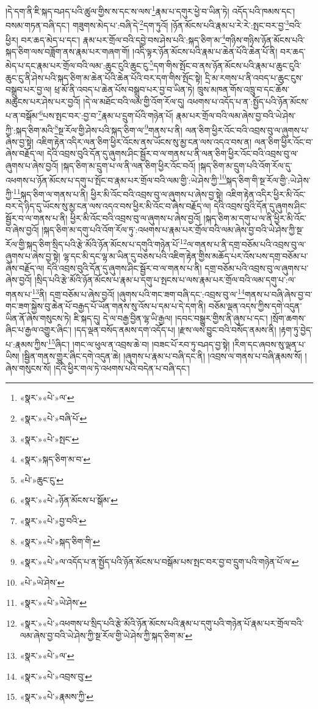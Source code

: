 །དེ་དག་ནི་ཇི་སྐད་བཤད་པའི་ཚུལ་གྱིས་ས་དང་ས་ལས་\footnote{«སྣར་»«པེ་»ལ་}རྣམ་པ་དགུར་ཕྱེ་བ་ཡིན་ཏེ། འདོད་པའི་ཁམས་དང་། བསམ་གཏན་བཞི་དང་། གཟུགས་མེད་པ་:བཞི་དེ་\footnote{«སྣར་»«པེ་»བཞི་པོ་}དག་ཏུའོ། །ཉོན་མོངས་པའི་རྣམ་པ་རེ་རེ་:སྤང་བར་བྱ་\footnote{«སྣར་»«པེ་»སྤང་}བའི་ཕྱིར། བར་ཆད་མེད་པ་དང་། རྣམ་པར་གྲོལ་བའི་དབྱེ་བས་ཤེས་པའི་:སྐད་ཅིག་མ་\footnote{«སྣར་»སྐད་ཅིག་མ་བ་}གཉིས་གཉིས་ཉོན་མོངས་པའི་སྐད་ཅིག་ལས་བཟློག་ནས་རྣམ་པར་གཞག་གོ། །འདི་ལྟར་ཉོན་མོངས་པའི་རྣམ་པ་ཆེན་པོའི་ཆེན་པོ་ནི། བར་ཆད་མེད་པ་དང་རྣམ་པར་གྲོལ་བའི་ལམ་:ཆུང་ངུའི་ཆུང་ངུ་\footnote{«པེ་»ཆུང་ངུ་}དག་གིས་སྤོང་བ་ནས་ཉོན་མོངས་པའི་རྣམ་པ་ཆུང་ངུའི་ཆུང་ངུ་ནི་ཤེས་པའི་སྐད་ཅིག་མ་ཆེན་པོའི་ཆེན་པོའི་བར་དག་གིས་སྤོང་སྟེ། དྲི་མ་རགས་པ་ནི་འབད་པ་ཆུང་ངུས་བསྒྲུབ་པར་བྱ་ལ། ཕྲ་མོ་ནི་འབད་པ་ཆེན་པོས་བསྒྲུབ་པར་བྱ་བ་ཡིན་ཏེ། ཁྲུས་མཁན་གོས་འཁྲུ་བ་དང་ཆོས་མཚུངས་པར་ཤེས་པར་བྱའོ། །དེ་ལ་མཐོང་བའི་ལམ་གྱི་འོག་རོལ་དུ། འཕགས་པ་འདོད་པ་ན་:སྤྱོད་པའི་ཉོན་མོངས་པ་ན་བསྒོམ་\footnote{«སྣར་»«པེ་»ཉོན་མོངས་པ་སྒོམ་}པས་སྤང་བར་:བྱ་བ་\footnote{«སྣར་»«པེ་»བྱ་བའི་}རྣམ་པ་དྲུག་པོའི་གཉེན་པོ། རྣམ་པར་གྲོལ་བའི་ལམ་ཞེས་བྱ་བའི་ཡེ་ཤེས་ཀྱི་:སྐད་ཅིག་མའི་\footnote{«སྣར་»«པེ་»སྐད་ཅིག་གི་}སྔ་རོལ་གྱི་ཤེས་པའི་སྐད་ཅིག་ལ་\footnote{«སྣར་»«པེ་»ལ་འདོད་པ་ན་སྤྱོད་པའི་ཉོན་མོངས་པ་བསྒོམ་པས་སྤང་བར་བྱ་བ་དྲུག་པའི་གཉེན་པོ་ལ་}གནས་པ་ནི། ལན་ཅིག་ཕྱིར་འོང་བའི་འབྲས་བུ་ལ་ཞུགས་པ་ཞེས་བྱ་སྟེ། འཇིག་རྟེན་འདིར་ལན་ཅིག་ཕྱིར་འོངས་ནས་ཡོངས་སུ་མྱ་ངན་ལས་འདའ་བས་ན། ལན་ཅིག་ཕྱིར་འོང་བ་ཞེས་བརྗོད་ལ། དེའི་འབྲས་བུའི་དོན་དུ་ཞུགས་ཤིང་སྦྱོར་བ་ལ་གནས་པ་ནི་ལན་ཅིག་ཕྱིར་འོང་བའི་འབྲས་བུ་ལ་ཞུགས་པ་ཞེས་བྱའོ། །སྐད་ཅིག་མ་དྲུག་པ་ལ་ནི་ལན་ཅིག་ཕྱིར་འོང་བའོ། །སྐད་ཅིག་མ་དྲུག་པའི་འོག་རོལ་དུ་འཕགས་པ་ཉོན་མོངས་པ་དགུ་པ་སྤོང་བ་རྣམ་པར་གྲོལ་བའི་ལམ་གྱི་:ཡེ་ཤེས་ཀྱི་\footnote{«པེ་»ཡེ་ཤེས་}སྐད་ཅིག་གི་སྔ་རོལ་གྱི་:ཡེ་ཤེས་ཀྱི་\footnote{«སྣར་»«པེ་»ཡེ་ཤེས་}སྐད་ཅིག་ལ་གནས་པ་ནི། ཕྱིར་མི་འོང་བའི་འབྲས་བུ་ལ་ཞུགས་པ་ཞེས་བྱ་སྟེ། འཇིག་རྟེན་འདིར་ཕྱིར་མི་འོང་བར་དེ་ཉིད་དུ་ཡོངས་སུ་མྱ་ངན་ལས་འདའ་བས་ཕྱིར་མི་འོང་བ་ཞེས་བརྗོད་ལ། དེའི་འབྲས་བུའི་དོན་དུ་ཞུགས་ཤིང་སྦྱོར་བ་ལ་གནས་པ་ནི། ཕྱིར་མི་འོང་བའི་འབྲས་བུ་ལ་ཞུགས་པ་ཞེས་བྱའོ། །སྐད་ཅིག་མ་དགུ་པ་ལ་ནི་ཕྱིར་མི་འོང་བ་ཞེས་བྱའོ། །སྐད་ཅིག་མ་དགུ་པའི་འོག་རོལ་ཏུ་:འཕགས་པ་རྣམ་པར་གྲོལ་བའི་ལམ་ཞེས་བྱ་བའི་ཡེ་ཤེས་ཀྱི་སྔ་རོལ་གྱི་སྐད་ཅིག་སྲིད་པའི་རྩེ་མོའི་ཉོན་མོངས་པ་དགུའི་གཉེན་པོ་\footnote{«སྣར་»«པེ་»འཕགས་པ་སྲིད་པའི་རྩེ་མོའི་ཉོན་མོངས་པའི་རྣམ་པ་དགུ་པའི་གཉེན་པོ་རྣམ་པར་གྲོལ་བའི་ལམ་ཞེས་བྱ་བའི་ཡེ་ཤེས་ཀྱི་སྔ་རོལ་གྱི་ཡེ་ཤེས་ཀྱི་སྐད་ཅིག་མ་}ལ་གནས་པ་ནི་དགྲ་བཅོམ་པའི་འབྲས་བུ་ལ་ཞུགས་པ་ཞེས་བྱ་སྟེ། ལྷ་དང་མི་དང་ལྷ་མ་ཡིན་དུ་བཅས་པའི་འཇིག་རྟེན་གྱིས་མཆོད་པར་འོས་པས་དགྲ་བཅོམ་པ་ཞེས་བརྗོད་ལ། དེའི་འབྲས་བུའི་དོན་དུ་ཞུགས་ཤིང་སྦྱོར་བ་ལ་གནས་པ་ནི། དགྲ་བཅོམ་པའི་འབྲས་བུ་ལ་ཞུགས་པ་ཞེས་བྱའོ། །སྲིད་པའི་རྩེ་མོའི་ཉོན་མོངས་པ་རྣམ་པ་དགུ་པ་སྤངས་པ་ལས་རྣམ་པར་གྲོལ་བའི་ལམ་དགུ་པ་:ལ་གནས་པ་\footnote{«སྣར་»«པེ་»ལ་}ནི། དགྲ་བཅོམ་པ་ཞེས་བྱའོ། །ཞུགས་པའི་གང་ཟག་བཞི་དང་:འབྲས་བུ་ལ་\footnote{«སྣར་»«པེ་»འབྲས་བུ་}གནས་པ་བཞི་ཞེས་བྱ་བ་གང་ཟག་སྐྱེས་བུ་ཆེན་པོ་བརྒྱད་པོ་ཡོན་གནས་སུ་འོས་པ་དམ་པ་དེ་དག་ནི། བཅོམ་ལྡན་འདས་ཀྱིས་དགེ་འདུན་ཡིན་ནོ་ཞེས་གསུངས་ཏེ། ཇི་སྐད་དུ། དེ་ལ་བརྒྱ་བྱིན་ལྷ་ཡི་རྒྱལ། །དབང་བསྒྱུར་གྱིས་ནི་ཞུས་པ་དང་། །སྲོག་ཆགས་ཞིང་པ་རྒྱལ་འགྱུར་ཞིང་། །དད་ལྡན་བསོད་ནམས་དག་འདོད་པ། །རྫས་ལས་བྱུང་བའི་བསོད་ནམས་ནི། །རྟག་ཏུ་བྱེད་པ་:རྣམས་ཀྱིས་\footnote{«སྣར་»«པེ་»རྣམས་ཀྱི་}ཞིང་། །གང་ལ་ཕུལ་ན་འབྲས་ཆེ་བ། །བཟང་པོ་རབ་ཏུ་བཤད་བྱ་སྟེ། །རིག་དང་ཞབས་སུ་ལྡན་པ་ཡིས། །སྦྱིན་གནས་གྱུར་ཞིང་དགེ་འདུན་ཆེ། །ཞུགས་པ་རྣམ་པ་བཞི་དང་ནི། །འབྲས་ལ་གནས་པ་བཞི་རྣམས་སོ། །ཞེས་གསུངས་སོ། །དེའི་ཕྱིར་གལ་ཏེ་འཕགས་པའི་བདེན་པ་བཞི་དང་། 